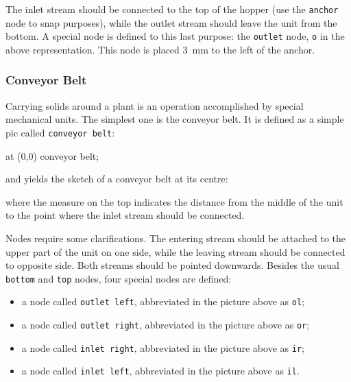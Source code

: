 \documentclass[12pt]{article}						%
\newcommand*{\chpn}[1]{\texttt{#1}}				%
\newcommand*{\chpp}[1]{\texttt{#1}}				%
\begin{document}
The inlet stream should be connected to the top of the hopper (use the
\chpn{anchor} node  to snap purposes), while the outlet stream should leave the
unit from the bottom. A special node is defined to this last purpose: the
\chpn{outlet} node, \chpn{o} in the above representation. This node is placed
\SI{3}{\mm} to the left of the anchor.

\subsubsection{Conveyor Belt}

Carrying solids around a plant is an operation accomplished by special mechanical
units. The simplest one is the conveyor belt. It is defined as a simple pic
called \chpp{conveyor belt}:
\begin{chpcode}
	\pic at (0,0) {conveyor belt};
\end{chpcode}
and yields the sketch of a conveyor belt at its centre:
\begin{center}
\end{center}
where the measure on the top indicates the distance from the middle of the
unit to the point where the inlet stream should be connected.

Nodes require some clarifications. The entering stream should be attached to the
upper part of the unit on one side, while the leaving stream should be connected
to opposite side. Both streams should be pointed downwards. Besides the usual
\chpn{bottom} and \chpn{top} nodes, four special nodes are defined:
\begin{itemize}
	\item a node called \chpn{outlet left}, abbreviated in the picture above as
		\chpn{ol};
	\item a node called \chpn{outlet right}, abbreviated in the picture above as
		\chpn{or};
	\item a node called \chpn{inlet right}, abbreviated in the picture above as
		\chpn{ir};
	\item a node called \chpn{inlet left}, abbreviated in the picture above as
		\chpn{il}.
\end{itemize}
\end{document}
